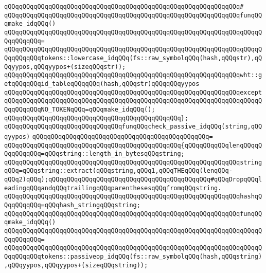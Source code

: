 \verb|qQQqqQQqqQQqqQQqqQQqqQQqqQQqqQQqqQQqqQQqqQQqqQQqqQQqqQQqqQQqqQQq#|\newline
\verb|qQQqqQQqqQQqqQQqqQQqqQQqqQQqqQQqqQQqqQQqqQQqqQQqqQQqqQQqqQQqqQQqfunqQQqmake_idqQQq()|\newline
\verb|qQQqqQQqqQQqqQQqqQQqqQQqqQQqqQQqqQQqqQQqqQQqqQQqqQQqqQQqqQQqqQQqqQQqqQQqqQQqqQQq=|\newline
\verb|qQQqqQQqqQQqqQQqqQQqqQQqqQQqqQQqqQQqqQQqqQQqqQQqqQQqqQQqqQQqqQQqqQQqqQQqqQQqqQQqtokens::lowercase_idqQQq(fs::raw_symbolqQQq(hash,qQQqstr),qQQqyypos,qQQqyypos+(sizeqQQqstr));|\newline
\newline
\verb|qQQqqQQqqQQqqQQqqQQqqQQqqQQqqQQqqQQqqQQqqQQqqQQqqQQqqQQqqQQqqQQqwht::getqQQqqQQqid_tableqQQqqQQq(hash,qQQqstr)qQQqqQQqyypos|\newline
\verb|qQQqqQQqqQQqqQQqqQQqqQQqqQQqqQQqqQQqqQQqqQQqqQQqqQQqqQQqqQQqqQQqexcept|\newline
\verb|qQQqqQQqqQQqqQQqqQQqqQQqqQQqqQQqqQQqqQQqqQQqqQQqqQQqqQQqqQQqqQQqqQQqqQQqqQQqqQQqNO_TOKENqQQq=qQQqmake_idqQQq();|\newline
\verb|qQQqqQQqqQQqqQQqqQQqqQQqqQQqqQQqqQQqqQQqqQQqqQQq};|\newline
\newline
\verb|qQQqqQQqqQQqqQQqqQQqqQQqqQQqqQQqfunqQQqcheck_passive_idqQQq(string,qQQqyypos)|\newline
\verb|qQQqqQQqqQQqqQQqqQQqqQQqqQQqqQQqqQQqqQQqqQQqqQQq=|\newline
\verb|qQQqqQQqqQQqqQQqqQQqqQQqqQQqqQQqqQQqqQQqqQQqqQQq{qQQqqQQqqQQqlenqQQqqQQqqQQqqQQq=qQQqstring::length_in_bytesqQQqstring;|\newline
\verb|qQQqqQQqqQQqqQQqqQQqqQQqqQQqqQQqqQQqqQQqqQQqqQQqqQQqqQQqqQQqqQQqstringqQQq=qQQqstring::extract(qQQqstring,qQQq1,qQQqTHEqQQq(lenqQQq-qQQq2)qQQq);qQQqqQQqqQQqqQQqqQQqqQQqqQQqqQQqqQQqqQQqqQQq#qQQqDropqQQqleadingqQQqandqQQqtrailingqQQqparenthesesqQQqfromqQQqstring.|\newline
\newline
\verb|qQQqqQQqqQQqqQQqqQQqqQQqqQQqqQQqqQQqqQQqqQQqqQQqqQQqqQQqqQQqqQQqhashqQQqqQQqqQQq=qQQqhash_stringqQQqstring;|\newline
\newline
\verb|qQQqqQQqqQQqqQQqqQQqqQQqqQQqqQQqqQQqqQQqqQQqqQQqqQQqqQQqqQQqqQQqfunqQQqmake_idqQQq()|\newline
\verb|qQQqqQQqqQQqqQQqqQQqqQQqqQQqqQQqqQQqqQQqqQQqqQQqqQQqqQQqqQQqqQQqqQQqqQQqqQQqqQQq=|\newline
\verb|qQQqqQQqqQQqqQQqqQQqqQQqqQQqqQQqqQQqqQQqqQQqqQQqqQQqqQQqqQQqqQQqqQQqqQQqqQQqqQQqtokens::passiveop_idqQQq(fs::raw_symbolqQQq(hash,qQQqstring),qQQqyypos,qQQqyypos+(sizeqQQqstring));|\newline
